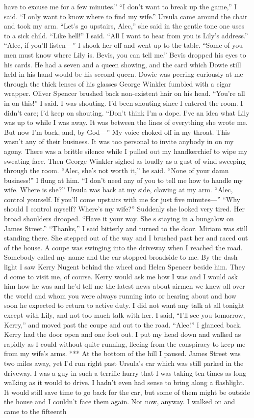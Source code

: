\documentclass{novel}
\begin{document}
have to excuse me for a few minutes.” “I don’t want to break up the game,” I said. “I only want to know where to find my wife.” Ursula came around the chair and took my arm. “Let’s go upstairs, Alec,” she said in the gentle tone one uses to a sick child. “Like hell!” I said. “All I want to hear from you is Lily’s address.” “Alec, if you’ll listen—” I shook her off and went up to the table. “Some of you men must know where Lily is. Bevis, you can tell me.” Bevis dropped his eyes to his cards. He had a seven and a queen showing, and the card which Dowie still held in his hand would be his second queen. Dowie was peering curiously at me through the thick lenses of his glasses George Winkler fumbled with a cigar wrapper. Oliver Spencer brushed back non-existent hair on his head. “You’re all in on this!” I said. I was shouting. I’d been shouting since I entered the room. I didn’t care; I’d keep on shouting. “Don’t think I’m a dope. I’ve an idea what Lily was up to while I was away. It was between the lines of everything she wrote me. But now I’m back, and, by God—” My voice choked off in my throat. This wasn’t any of their business. It was too personal to invite anybody in on my agony. There was a brittle silence while I pulled out my handkerchief to wipe my sweating face. Then George Winkler sighed as loudly as a gust of wind sweeping through the room. “Alec, she’s not worth it,” he said. “None of your damn business!” I flung at him. “I don’t need any of you to tell me how to handle my wife. Where is she?” Ursula was back at my side, clawing at my arm. “Alec, control yourself. If you’ll come upstairs with me for just five minutes—” “Why should I control myself? Where’s my wife?” Suddenly she looked very tired. Her broad shoulders drooped. “Have it your way. She s staying in a bungalow on James Street.” “Thanks,” I said bitterly and turned to the door. Miriam was still standing there. She stepped out of the way and I brushed past her and raced out of the house. A coupe was swinging into the driveway when I reached the road. Somebody called my name and the car stopped broadside to me. By the dash light I saw Kerry Nugent behind the wheel and Helen Spencer beside him. They d come to visit me, of course. Kerry would ask me how I was and I would ask him how he was and he’d tell me the latest news about airmen we knew all over the world and whom you were always running into or hearing about and how soon he expected to return to active duty. I did not want any talk at all tonight except with Lily, and not too much talk with her. I said, “I’ll see you tomorrow, Kerry,” and moved past the coupe and out to the road. “Alec!” I glanced back. Kerry had the door open and one foot out. I put my head down and walked as rapidly as I could without quite running, fleeing from the conspiracy to keep me from my wife’s arms. *** At the bottom of the hill I paused. James Street was two miles away, yet I’d run right past Ursula’s car which was still parked in the driveway. I was a guy in such a terrific hurry that I was taking ten times as long walking as it would to drive. I hadn’t even had sense to bring along a flashlight. It would still save time to go back for the car, but some of them might be outside the house and I couldn’t face them again. Not now, anyway. I walked on and came to the fifteenth 
\end{document}

